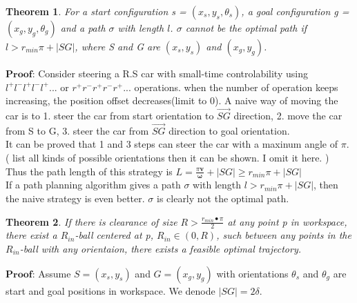 \documentclass[12pt]{article}
\newtheorem{theorem}{Theorem}[section]
\begin{document}
  \begin{theorem}
  	For a start configuration s = $(x_{s},y_{s},\theta_{s})$, a goal configuration g = $(x_{g},y_{g},\theta_{g})$ and a path $\sigma$ with length $l$. $\sigma$ cannot be the optimal path if $l > r_{min}\pi + |SG|$, where S and G are $(x_{s}, y_{s})$ and $(x_{g}, y_{g})$.
  \end{theorem} 
  
  $\textbf{Proof}$: Consider steering a R.S car with small-time controlability using $l^{+}l^{-}l^{+}l^{-}l^{+}...$ or $r^{+}r^{-}r^{+}r^{-}r^{+}...$ operations. when the number of operation keeps increasing, the position offset decreases(limit to 0). A naive way of moving the car is to 1. steer the car from start orientation to $\vec{SG}$ direction, 2. move the car from S to G, 3. steer the car from $\vec{SG}$ direction to goal orientation.\\
  
  It can be proved that 1 and 3 steps can steer the car with a maxinum angle of $\pi$. ( list all kinds of possible orientations then it can be shown. I omit it here. )\\
  
  Thus the path length of this strategy is $L = \frac{\pi\boldsymbol{v}}{\boldsymbol{\omega}} + |SG| \geq r_{min}\pi + |SG|$\\
  
  If a path planning algorithm gives a path $\sigma$ with length $ l > r_{min}\pi + |SG|$, then the naive strategy is even better. $\sigma$ is clearly not the optimal path.\\
   
  \begin{theorem}
  	If there is clearance of size $R > \frac{r_{min}•\pi}{2}$ at any point p in workspace, there exist a $R_{in}$-ball centered at p, $R_{in} \in (0, R)$, such between any points in the $R_{in}$-ball with any orientaion, there exists a feasible optimal trajectory.
  \end{theorem} 
  
  $\textbf{Proof}$: Assume $S = (x_{s}, y_{s})$ and $G = (x_{g}, y_{g})$ with orientations $\theta_{s}$ and $\theta_{g}$ are start and goal positions in workspace. We denode $|SG| = 2\delta$. \\
  
\end{document}
